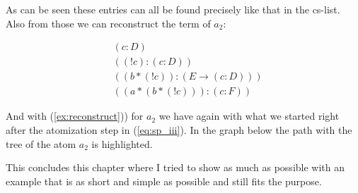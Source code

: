 As can be seen these entries can all be found precisely like that in the cs-list. Also from those we can reconstruct the term of $a_2$: 

\begin{align}
	& (c:D) \\
	& ((!c):(c:D)) \\
	& ((b*(!c)):(E \rightarrow (c:D)))\\
	& ((a*(b*(!c))):(c:F)) \label{ex:reconstruct}
\end{align}

And with (\ref{ex:reconstruct})) for $a_2$ we have again with what we started right after the atomization step in (\ref{eq:sp_iii}). In the graph below the path with the tree of the atom $a_2$ is highlighted.



\bigskip
This concludes this chapter where I tried to show as much as possible with an example that is as short and simple as possible and still fits the purpose. 
